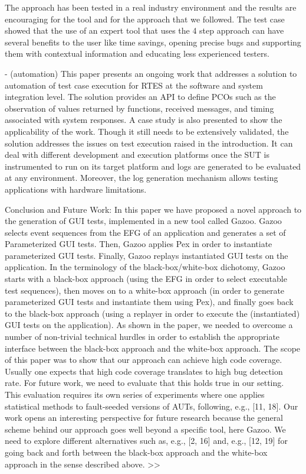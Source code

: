 \documentclass[runningheads,a4paper]{llncs}
\begin{document}
The approach has been tested in a real industry environment and the results are encouraging for the tool and for the approach that we followed. 
The test case showed that the use of an expert tool that uses the 4 step approach can have several benefits to the user like time savings, opening 
precise bugs and supporting them with contextual information and educating less
experienced testers.

- (automation) This paper presents an ongoing work that addresses a solution to automation of
test case execution for RTES at the software and system integration level. The solution
provides an API to define PCOs such as the observation of values returned by functions, 
received messages, and timing associated with system responses.
A case study is also presented to show the applicability of the work. Though it
still needs to be extensively validated, the solution addresses the issues on test
execution raised in the introduction. It can deal with different development and
execution platforms once the SUT is instrumented to run on its target platform
and logs are generated to be evaluated at any environment. Moreover, the log
generation mechanism allows testing applications with hardware limitations.

Conclusion and Future Work: In this paper we have proposed a novel approach to the generation of 
GUI tests, implemented in a new tool called Gazoo. Gazoo selects event sequences
from the EFG of an application and generates a set of Parameterized GUI tests.
Then, Gazoo applies Pex in order to instantiate parameterized GUI tests. Finally,
Gazoo replays instantiated GUI tests on the application. In the terminology of
the black-box/white-box dichotomy, Gazoo starts with a black-box approach
(using the EFG in order to select executable test sequences), then moves on to a
white-box approach (in order to generate parameterized GUI tests and instantiate
them using Pex), and finally goes back to the black-box approach (using
a replayer in order to execute the (instantiated) GUI tests on the application).
As shown in the paper, we needed to overcome a number of non-trivial technical
hurdles in order to establish the appropriate interface between the black-box
approach and the white-box approach.
The scope of this paper was to show that our approach can achieve high
code coverage. Usually one expects that high code coverage translates to high
bug detection rate. For future work, we need to evaluate that this holds true
in our setting. This evaluation requires its own series of experiments where one
applies statistical methods to fault-seeded versions of AUTs, following, e.g., [11,
18].
Our work opens an interesting perspective for future research because the
general scheme behind our approach goes well beyond a specific tool, here Gazoo.
We need to explore different alternatives such as, e.g., [2, 16] and, e.g., [12, 19]
for going back and forth between the black-box approach and the white-box
approach in the sense described above.
>>
\end{document}
